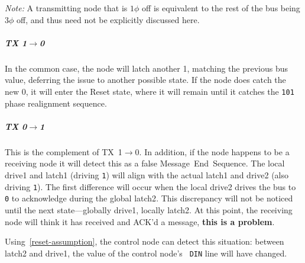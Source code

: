 \smallskip
\noindent
{\em Note:} A transmitting node that is $1\phi$ off is equivalent to the rest
of the bus being $3\phi$ off, and thus need not be explicitly discussed here.

\subparagraph{TX 1$\rightarrow$0}
In the common case, the node will latch another 1, matching the previous bus
value, deferring the issue to another possible state. If the node does catch
the new 0, it will enter the Reset state, where it will remain until it
catches the {\tt 101} phase realignment sequence.

\subparagraph{TX 0$\rightarrow$1}
\label{reset-phi1-tx-0-1}
This is the complement of TX~1$\rightarrow$0. In addition, if the node happens
to be a receiving node it will detect this as a false Message~End~Sequence.
The local {\sc drive1} and {\sc latch1} (driving {\tt 1}) will align with the
actual {\sc latch1} and {\sc drive2} (also driving {\tt 1}). The first
difference will occur when the local {\sc drive2} drives the bus to {\tt 0} to
acknowledge during the global {\sc latch2}. This discrepancy will not be
noticed until the next state---globally {\sc drive1}, locally {\sc latch2}. At
this point, the receiving node will think it has received and ACK'd a message,
\textbf{this is a problem}.

Using~\ref{reset-assumption}, the control node can detect this situation:
between {\sc latch2} and {\sc drive1}, the value of the control node's {\tt
DIN} line will have changed.

